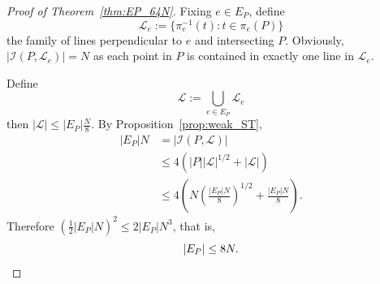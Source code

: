     \begin{proof}[Proof of Theorem~\ref{thm:EP_64N}]
    Fixing $e \in E_{P}$, define
        \begin{equation*}
            \mathscr{L}_{e}:=\{ \pi_{e}^{-1}(t): t \in \pi_{e}(P) \}
        \end{equation*}
    the family of lines perpendicular to $e$ and intersecting $P$. Obviously, $|\mathscr{I}(P,\mathscr{L}_{e})|=N$ as each point in $P$ is contained in exactly one line in $\mathscr{L}_{e}$.

    Define
        \begin{equation*}
            \mathscr{L}:=\bigcup_{e\in E_{P}}\mathscr{L}_{e}
        \end{equation*}
    then $|\mathscr{L}|\leq |E_{P}| \frac{N}{8}$. By Proposition~\ref{prop:weak_ST},
    \begin{align*}
        |E_{P}|N &= |\mathscr{I}(P,\mathscr{L})| \\
        &\leq 4(|P||\mathscr{L}|^{1/2}+|\mathscr{L}|) \\
        &\leq 4\left( N\left( \frac{|E_{P}|N}{8} \right)^{1/2} + \frac{|E_{P}|N}{8} \right).
    \end{align*}
    Therefore $\left( \frac{1}{2}|E_{P}|N \right)^{2}\leq 2|E_{P}|N^{3}$, that is,
        \begin{equation*}
            |E_{P}|\leq 8N.\qedhere
        \end{equation*}
    \end{proof}


